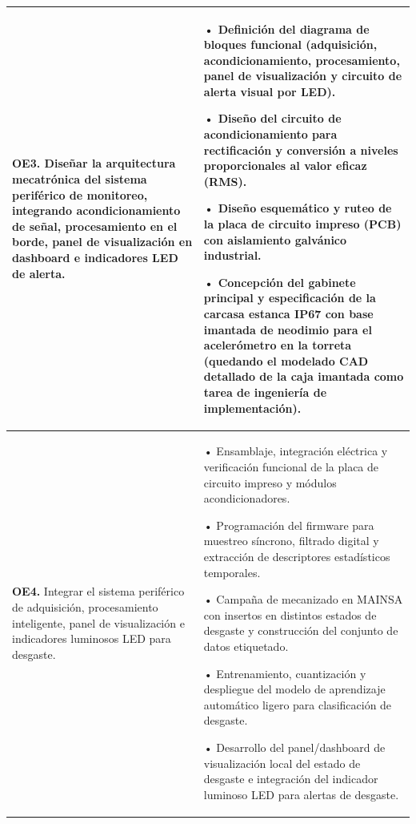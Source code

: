 {\begin{longtable}{|>{\raggedright\arraybackslash}p{4.8cm}|>{\raggedright\arraybackslash}p{9.2cm}|}
\textbf{OE3.} Diseñar la arquitectura mecatrónica del sistema periférico de monitoreo, integrando acondicionamiento de señal, procesamiento en el borde, panel de visualización en dashboard e indicadores LED de alerta. & 
• Definición del diagrama de bloques funcional (adquisición, acondicionamiento, procesamiento, panel de visualización y circuito de alerta visual por LED).\par\vspace{1mm}
• Diseño del circuito de acondicionamiento para rectificación y conversión a niveles proporcionales al valor eficaz (RMS).\par\vspace{1mm}
• Diseño esquemático y ruteo de la placa de circuito impreso (PCB) con aislamiento galvánico industrial.\par\vspace{1mm}
• Concepción del gabinete principal y especificación de la carcasa estanca IP67 con base imantada de neodimio para el acelerómetro en la torreta (quedando el modelado CAD detallado de la caja imantada como tarea de ingeniería de implementación).\\ \hline

\textbf{OE4.} Integrar el sistema periférico de adquisición, procesamiento inteligente, panel de visualización e indicadores luminosos LED para desgaste. & 
• Ensamblaje, integración eléctrica y verificación funcional de la placa de circuito impreso y módulos acondicionadores.\par\vspace{1mm}
• Programación del firmware para muestreo síncrono, filtrado digital y extracción de descriptores estadísticos temporales.\par\vspace{1mm}
• Campaña de mecanizado en MAINSA con insertos en distintos estados de desgaste y construcción del conjunto de datos etiquetado.\par\vspace{1mm}
• Entrenamiento, cuantización y despliegue del modelo de aprendizaje automático ligero para clasificación de desgaste.\par\vspace{1mm}
• Desarrollo del panel/dashboard de visualización local del estado de desgaste e integración del indicador luminoso LED para alertas de desgaste.\\ \hline


\end{longtable}}
